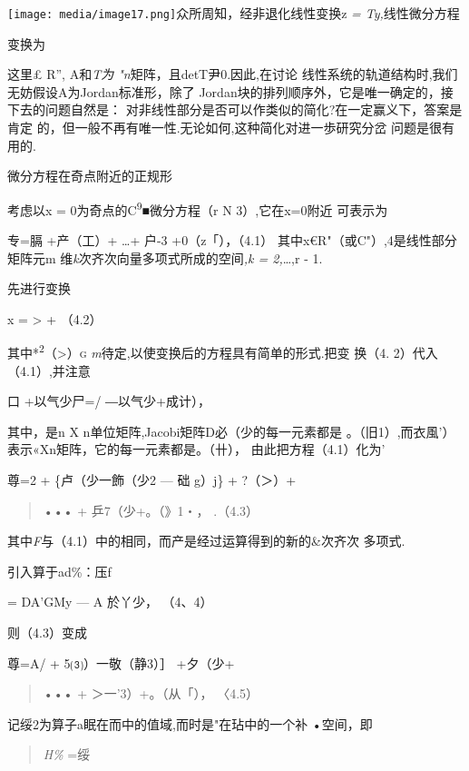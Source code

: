 \documentclass{article}
\begin{document}
\texttt{[image: media/image17.png]}众所周知，经非退化线性变换z
\emph{= Ty,}线性微分方程

变换为

这里£ R'', A和\emph{T为 "n}矩阵，且detT尹0.因此,在讨论
线性系统的轨道结构时,我们无妨假设A为Jordan标准形，除了
Jordan块的排列顺序外，它是唯一确定的，接下去的问题自然是：
对非线性部分是否可以作类似的简化?在一定赢义下，答案是肯定
的，但一般不再有唯一性.无论如何,这种简化对进一歩研究分岔 问题是很有用的.

微分方程在奇点附近的正规形

考虑以x = 0为奇点的C\textsuperscript{9}■微分方程（r N 3）,它在x=0附近
可表示为

专=膈 +产（工）+ \ldots{}+ 户-3 +0（\textbar{}z\textbar{}「），（4.1）
其中x€R"（或C"）,4是线性部分矩阵元m
维\emph{k}次齐次向量多项式所成的空间\emph{,k = 2,}\ldots{},r - 1.

先进行变换

x = \textgreater{} + （4.2）

其中*\textsuperscript{2}（\textgreater{}）\textsc{g}
\emph{m}待定,以使变换后的方程具有简单的形式.把变 换（4.
2）代入（4.1）,并注意

口 +以气少尸=/ ―以气少+成\textbar{}计），

其中，是n X n单位矩阵,Jacobi矩阵D必（少的每一元素都是
。（旧1）,而衣風'）表示«Xn矩阵，它的每一元素都是。（\textbar{}卄），
由此把方程（4.1）化为'

尊=2 + \{卢（少一飾（少2 --- 础 g）j\} + ?（＞）+

\begin{quote}
••• + 乒7（少+。（》1・， .（4.3）
\end{quote}

其中\emph{F}与（4.1）中的相同，而产是经过运算得到的新的\&次齐次 多项式.

引入算于ad\%：压f

= DA'GMy --- A 於丫少， （4、4）

则（4.3）变成

尊=A/ + 5⑶）一敬（静3）］ +夕（少+

\begin{quote}
••• + ＞一'3）+。（\textbar{}从「）， 〈4.5）
\end{quote}

记绥2为算子a眠在而中的值域,而时是"在玷中的一个补 •空间，即

\begin{quote}
\emph{H\%} =绥
\end{quote}
\end{document}
